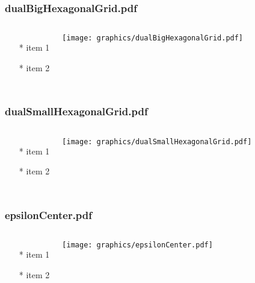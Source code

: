 \documentclass{beamer}
\begin{document}
\begin{frame} \frametitle{dualBigHexagonalGrid.pdf}
    \begin{columns}[c]
        \begin{itemize}
            \item[*] item 1
            \item[*] item 2
        \end{itemize}
        \begin{minipage}{\linewidth}
            \begin{center}
            \texttt{[image: graphics/dualBigHexagonalGrid.pdf]}
            \label{gfx:dualBigHexagonalGrid.pdf}
            \end{center}
        \end{minipage}
    \end{columns}
\end{frame}
\begin{frame} \frametitle{dualSmallHexagonalGrid.pdf}
    \begin{columns}[c]
        \begin{itemize}
            \item[*] item 1
            \item[*] item 2
        \end{itemize}
        \begin{minipage}{\linewidth}
            \begin{center}
            \texttt{[image: graphics/dualSmallHexagonalGrid.pdf]}
            \label{gfx:dualSmallHexagonalGrid.pdf}
            \end{center}
        \end{minipage}
    \end{columns}
\end{frame}
\begin{frame} \frametitle{epsilonCenter.pdf}
    \begin{columns}[c]
        \begin{itemize}
            \item[*] item 1
            \item[*] item 2
        \end{itemize}
        \begin{minipage}{\linewidth}
            \begin{center}
            \texttt{[image: graphics/epsilonCenter.pdf]}
            \label{gfx:epsilonCenter.pdf}
            \end{center}
        \end{minipage}
    \end{columns}
\end{frame}
\end{document}
